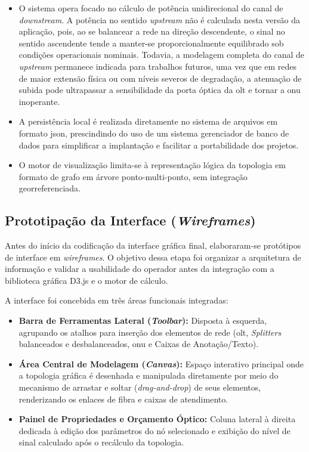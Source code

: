 \begin{itemize}
    \item O sistema opera focado no cálculo de potência unidirecional do canal de \textit{downstream}. A potência no sentido \textit{upstream} não é calculada nesta versão da aplicação, pois, ao se balancear a rede na direção descendente, o sinal no sentido ascendente tende a manter-se proporcionalmente equilibrado sob condições operacionais nominais. Todavia, a modelagem completa do canal de \textit{upstream} permanece indicada para trabalhos futuros, uma vez que em redes de maior extensão física ou com níveis severos de degradação, a atenuação de subida pode ultrapassar a sensibilidade da porta óptica da \gls{olt} e tornar a \gls{onu} inoperante.
    
    \item A persistência local é realizada diretamente no sistema de arquivos em formato \gls{json}, prescindindo do uso de um sistema gerenciador de banco de dados para simplificar a implantação e facilitar a portabilidade dos projetos.
    
    \item O motor de visualização limita-se à representação lógica da topologia em formato de grafo em árvore ponto-multi-ponto, sem integração georreferenciada.
\end{itemize}

\subsection{Prototipação da Interface (\textit{Wireframes})}

Antes do início da codificação da interface gráfica final, elaboraram-se protótipos de interface em \textit{wireframes}. O objetivo dessa etapa foi organizar a arquitetura de informação e validar a usabilidade do operador antes da integração com a biblioteca gráfica D3.js e o motor de cálculo.

A interface foi concebida em três áreas funcionais integradas:
\begin{itemize}
    \item \textbf{Barra de Ferramentas Lateral (\textit{Toolbar}):} Disposta à esquerda, agrupando os atalhos para inserção dos elementos de rede (\gls{olt}, \textit{Splitters} balanceados e desbalanceados, \gls{onu} e Caixas de Anotação/Texto).
    
    \item \textbf{Área Central de Modelagem (\textit{Canvas}):} Espaço interativo principal onde a topologia gráfica é desenhada e manipulada diretamente por meio do mecanismo de arrastar e soltar (\textit{drag-and-drop}) de seus elementos, renderizando os enlaces de fibra e caixas de atendimento.
    
    \item \textbf{Painel de Propriedades e Orçamento Óptico:} Coluna lateral à direita dedicada à edição dos parâmetros do nó selecionado e exibição do nível de sinal calculado após o recálculo da topologia.
\end{itemize}

